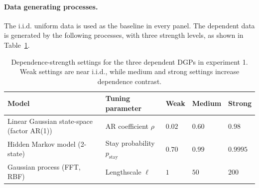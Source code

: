 \documentclass[12pt]{article}
\theoremstyle{definition}
\begin{document}
\paragraph*{Data generating processes.}
The i.i.d. uniform data is used as the baseline in every panel. The dependent data is generated by the following processes, with three strength levels, as shown in Table~\ref{tab:exp1-dgp-settings}.

\begin{table}
  \caption{Dependence-strength settings for the three dependent DGPs in experiment 1. Weak settings are near i.i.d., while medium and strong settings increase dependence contrast.}
  \label{tab:exp1-dgp-settings}
  \centering
  \small
  \begin{tabular}{@{}lllll@{}}
    \toprule
    Model & Tuning parameter & Weak & Medium & Strong \\
    \midrule
    Linear Gaussian state-space (factor AR(1)) & AR coefficient $\rho$ & $0.02$ & $0.60$ & $0.98$ \\
    Hidden Markov model (2-state) & Stay probability $p_{\mathrm{stay}}$ & $0.70$ & $0.99$ & $0.9995$ \\
    Gaussian process (FFT, RBF) & Lengthscale $\ell$ & $1$ & $50$ & $200$ \\
    \bottomrule
  \end{tabular}
\end{table}
\end{document}
